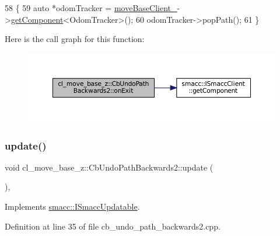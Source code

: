 \begin{DoxyCode}
58 \{
59   \textcolor{keyword}{auto} *odomTracker = \hyperlink{classcl__move__base__z_1_1CbMoveBaseClientBehaviorBase_ab2ef219464cfac8659b4a87c8d0db6d5}{moveBaseClient\_}->\hyperlink{classsmacc_1_1ISmaccClient_adef78db601749ca63c19e74a27cb88cc}{getComponent}<OdomTracker>();
60   odomTracker->popPath();
61 \}
\end{DoxyCode}
Here is the call graph for this function\+:
\nopagebreak
\begin{figure}[H]
\begin{center}
\leavevmode
\includegraphics[width=350pt]{classcl__move__base__z_1_1CbUndoPathBackwards2_ae493fcd813176d8473ff08680beb7afe_cgraph}
\end{center}
\end{figure}
\mbox{\label{classcl__move__base__z_1_1CbUndoPathBackwards2_a62f0d53fc341ca6d241637cc0e4b2e30}} 
\subsubsection{\texorpdfstring{update()}{update()}}
{\footnotesize\ttfamily void cl\+\_\+move\+\_\+base\+\_\+z\+::\+Cb\+Undo\+Path\+Backwards2\+::update (\begin{DoxyParamCaption}{ }\end{DoxyParamCaption})\hspace{0.3cm}{\ttfamily [override]}, {\ttfamily [virtual]}}



Implements \hyperlink{classsmacc_1_1ISmaccUpdatable_a84ee0520cbefdb1d412bed54650b028e}{smacc\+::\+I\+Smacc\+Updatable}.



Definition at line 35 of file cb\+\_\+undo\+\_\+path\+\_\+backwards2.\+cpp.



